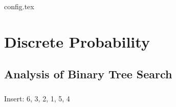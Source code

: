 \documentclass[12pt,a4paper,oneside]{report}
\begin{document}
{config.tex}

\fi

\setcounter{chapter}{7}
\chapter{Discrete Probability}


\section{Analysis of Binary Tree Search}

\paragraph{} Insert: 6, 3, 2, 1, 5, 4
\end{document}
